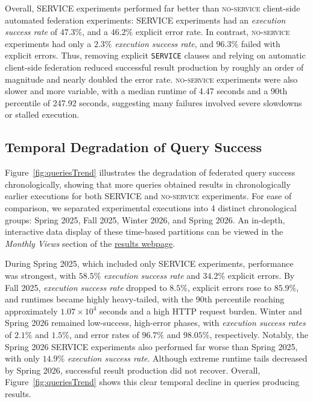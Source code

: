\documentclass[runningheads]{llncs}
\begin{document}
Overall, \textsc{SERVICE} experiments performed far better than \textsc{no-service} client-side automated federation experiments: \textsc{SERVICE} experiments had an \emph{execution success rate} of \(47.3\%\), and a \(46.2\%\) explicit error rate.
In contrast, \textsc{no-service} experiments had only a \(2.3\%\) \emph{execution success rate}, and \(96.3\%\) failed with explicit errors.
Thus, removing explicit \texttt{SERVICE} clauses and relying on automatic client-side federation reduced successful result production by roughly an order of magnitude and nearly doubled the error rate.
\textsc{no-service} experiments were also slower and more variable, with a median runtime of 4.47 seconds and a 90th percentile of 247.92 seconds, suggesting many failures involved severe slowdowns or stalled execution.



\subsection{Temporal Degradation of Query Success}\label{sec5.1}


Figure~\ref{fig:queriesTrend} illustrates the degradation of federated query success chronologically, showing that more queries obtained results in chronologically earlier executions for both \textsc{SERVICE} and \textsc{no-service} experiments.
For ease of comparison, we separated experimental executions into 4 distinct chronological groups: Spring 2025, Fall 2025, Winter 2026, and Spring 2026.
An in-depth, interactive data display of these time-based partitions can be viewed in the \textit{Monthly Views} section of the \href{https://ecrum19.github.io/fed-survey-results/}{results webpage}.

During Spring 2025, which included only \textsc{SERVICE} experiments, performance was strongest, with \(58.5\%\) \emph{execution success rate} and \(34.2\%\) explicit errors.
By Fall 2025, \emph{execution success rate} dropped to \(8.5\%\), explicit errors rose to \(85.9\%\), and runtimes became highly heavy-tailed, with the 90th percentile reaching approximately \(1.07\times 10^4\) seconds and a high HTTP request burden.
Winter and Spring 2026 remained low-success, high-error phases, with \emph{execution success rates} of \(2.1\%\) and \(1.5\%\), and error rates of \(96.7\%\) and \(98.05\%\), respectively.
Notably, the Spring 2026 \textsc{SERVICE} experiments also performed far worse than Spring 2025, with only \(14.9\%\) \emph{execution success rate}.
Although extreme runtime tails decreased by Spring 2026, successful result production did not recover.
Overall, Figure~\ref{fig:queriesTrend} shows this clear temporal decline in queries producing results.
\end{document}
